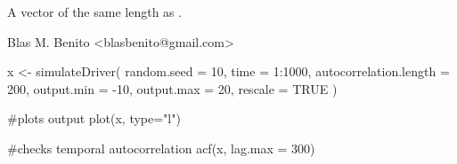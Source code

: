 \documentclass[letterpaper]{book}
\begin{document}
%
\begin{Value}
A vector of the same length as .
\end{Value}
%
\begin{Author}\relax
Blas M. Benito  <blasbenito@gmail.com>
\end{Author}
%
\begin{SeeAlso}\relax
{}
\end{SeeAlso}
%
\begin{Examples}
\begin{ExampleCode}

x <- simulateDriver(
  random.seed = 10,
  time = 1:1000,
  autocorrelation.length = 200,
  output.min = -10,
  output.max = 20,
  rescale = TRUE
  )

#plots output
plot(x, type="l")

#checks temporal autocorrelation
acf(x, lag.max = 300)

\end{ExampleCode}
\end{Examples}
%
\end{document}
